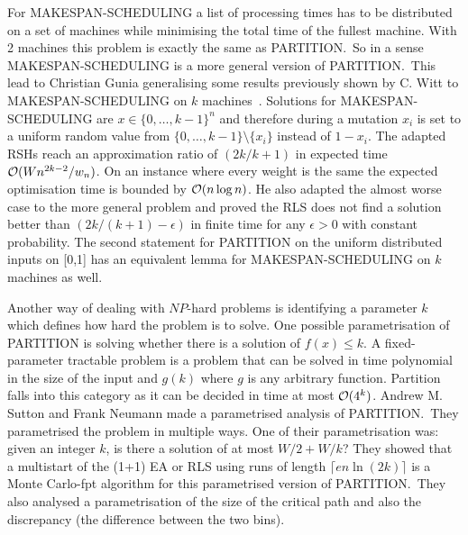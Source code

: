 For MAKESPAN-SCHEDULING a list of processing times has to be distributed on a set of machines while minimising the total time of the fullest machine.
With 2 machines this problem is exactly the same as PARTITION.\
So in a sense MAKESPAN-SCHEDULING is a more general version of PARTITION.\
This lead to Christian Gunia generalising some results previously shown by C. Witt to MAKESPAN-SCHEDULING on $k$ machines~\cite{gunia2005analysis}.
Solutions for MAKESPAN-SCHEDULING are \(x\in{\{0,\dots,k-1\}}^n\) and therefore during a mutation $x_i$ is set to a uniform random value from $\{0,\dots,k-1\}\text{\textbackslash}\{x_i\}$ instead of $1-x_i$.
The adapted RSHs reach an approximation ratio of $(2k/k+1)$ in expected time $\mathcal{O}(Wn^{2k-2}/w_n)$.
On an instance where every weight is the same the expected optimisation time is bounded by $\mathcal{O}(n\log{n})$.
He also adapted the almost worse case to the more general problem and proved the RLS does not find a solution better than \((2k/(k+1)-\epsilon)\) in finite time for any $\epsilon>0$ with constant probability.
The second statement for PARTITION on the uniform distributed inputs on [0,1] has an equivalent lemma for MAKESPAN-SCHEDULING on $k$ machines as well.

Another way of dealing with $NP$-hard problems is identifying a parameter $k$ which defines how hard the problem is to solve.
One possible parametrisation of PARTITION is solving whether there is a solution of $f(x)\le k$.
A fixed-parameter tractable problem is a problem that can be solved in time polynomial in the size of the input and $g(k)$ where $g$ is any arbitrary function.
Partition falls into this category as it can be decided in time at most $\mathcal{O}(4^k)$\cite{fernau2005parameterized}.
Andrew M. Sutton and Frank Neumann made a parametrised analysis of PARTITION\cite{sutton2012parameterized}.\
They parametrised the problem in multiple ways.
One of their parametrisation was: given an integer $k$, is there a solution of at most $W/2+W/k$?
They showed that a multistart of the (1+1) EA or RLS using runs of length \(\lceil en\ln(2k)\rceil\) is a Monte Carlo-fpt algorithm for this parametrised version of PARTITION.\
They also analysed a parametrisation of the size of the critical path and also the discrepancy (the difference between the two bins).

